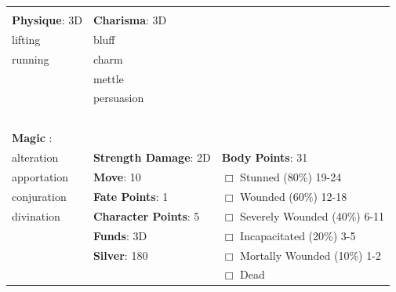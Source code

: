 \documentclass[10pt]{article}
\begin{document}
\begin{table}
\begin{tabular}{m{156pt} m{156pt} m{156pt}}
 \hrulefill &  \hrulefill &  \hrulefill \\


\textbf{Physique}: 3D \hrulefill & \textbf{Charisma}: 3D \hrulefill     &  \hrulefill \\

lifting              \hrulefill & bluff                \hrulefill &  \hrulefill \\

running              \hrulefill & charm                \hrulefill &  \hrulefill \\

 \hrulefill & mettle               \hrulefill &  \hrulefill \\

 \hrulefill & persuasion           \hrulefill &  \hrulefill \\

 \hrulefill &  \hrulefill &  \hrulefill \\

 \hrulefill &  \hrulefill &  \hrulefill \\

 \hrulefill &  \hrulefill &  \hrulefill \\

 \hrulefill &  \hrulefill &  \hrulefill \\

                                  &                                 &                             \\
\textbf{Magic }:  \hrulefill  &                                 &                             \\
alteration           \hrulefill & \textbf{Strength Damage}: 2D \hrulefill                             & \textbf{Body Points}: 31 \hrulefill \\
apportation          \hrulefill                        & \textbf{Move}:             10             \hrulefill    & $\Box$ Stunned \footnotesize{(80\%)} \hfill 19-24 \\
conjuration          \hrulefill                        & \textbf{Fate Points}:      1      \hrulefill    & $\Box$ Wounded \footnotesize{(60\%)} \hfill 12-18 \\
divination           \hrulefill                        & \textbf{Character Points}: 5 \hrulefill    & $\Box$ Severely Wounded \footnotesize{(40\%)} \hfill 6-11 \\
 \hrulefill                        & \textbf{Funds}:            3D            \hrulefill    & $\Box$ Incapacitated \footnotesize{(20\%)} \hfill 3-5 \\
 \hrulefill                        & \textbf{Silver}:           180           \hrulefill    & $\Box$ Mortally Wounded \footnotesize{(10\%)} \hfill 1-2 \\
 \hrulefill                        &  \hrulefill                                                       & $\Box$ Dead   \\
\end{tabular}
\end{table}
\end{document}
